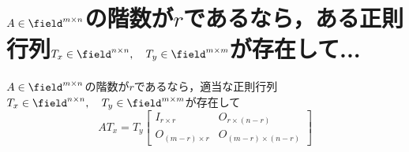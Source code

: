     \section{\texorpdfstring{$A\in\field^{m\times n}$}{A∈F\string^(m×n)}の階数が\texorpdfstring{$r$}{r}であるなら，ある正則行列\texorpdfstring{$T_x\in\field^{n\times n},\quad T_y\in\field^{m\times m}$}{Tx∈\string^(n×n), Ty∈\string^(m×m)}が存在して...}
        \label{th:Aの階数がrなら適当な正則行列Tx,Tyが存在して...}
        \begin{shadebox}
            $A\in\field^{m\times n}$の階数が$r$であるなら，適当な正則行列$T_x\in\field^{n\times n},\quad T_y\in\field^{m\times m}$が存在して
            \[
                AT_x = T_y
                \begin{bmatrix}
                    I_{r\times r}     & O_{r\times(n-r)} \\
                    O_{(m-r)\times r} & O_{(m-r)\times(n-r)}
                \end{bmatrix}
            \]
        \end{shadebox}

